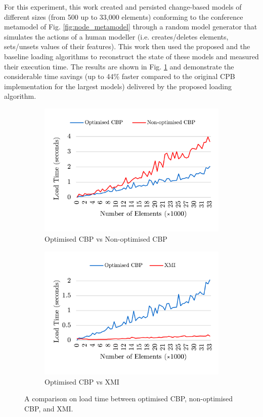 \documentclass[12pt, a4paper]{report} \usepackage[titletoc]{appendix}
\begin{document}
For this experiment, this work created and persisted change-based models of different sizes (from 500 up to 33,000 elements) conforming to the conference metamodel of Fig. \ref{fig:node_metamodel} through a random model generator that simulates the actions of a human modeller (i.e. creates/deletes elements, sets/unsets values of their features). This work then used the proposed and the baseline loading algorithms to reconstruct the state of these models and measured their execution time. The results are shown in Fig. \ref{fig:loading_speed_conf} and demonstrate the considerable time savings (up to 44\% faster compared to the original CPB implementation for the largest models) delivered by the proposed loading algorithm.

\begin{figure}[ht]	
	\begin{subfigure}[t]{0.5\linewidth}
		\includegraphics[width=\linewidth]{loading_speed_conf}
		\caption{Optimised CBP vs Non-optimised CBP}\label{fig:loading_speed_conf}
	\end{subfigure}
	\hfill
	\begin{subfigure}[t]{0.5\linewidth}
		\includegraphics[width=\linewidth]{loading_speed_conf_ocbp_xmi}
		\caption{Optimised CBP vs XMI}\label{fig:loading_speed_conf_ocbp_xmi}		
	\end{subfigure}	
	\caption{A comparison on load time between optimised CBP, non-optimised CBP, and XMI.}
	\label{fig:loading_speed}
\end{figure}
\end{document}
